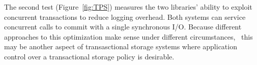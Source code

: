 \documentclass[letterpaper,twocolumn,english]{article}
\newcommand{\yad}{Lemon\xspace}
\begin{document}


The second test (Figure~\ref{fig:TPS}) measures the two libraries' ability to exploit
concurrent transactions to reduce logging overhead.  Both systems
can service concurrent calls to commit with a single 
synchronous I/O. Because different approaches to this 
optimization make sense under different circumstances,~\cite{findWorkOnThisOrRemoveTheSentence} this may 
be another aspect of transasctional storage systems where
application control over a transactional storage policy is desirable.  

\end{document}
